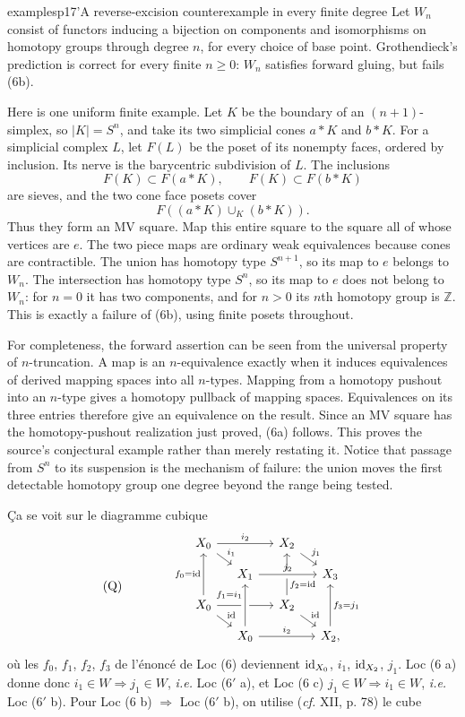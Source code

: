 \begin{dcomment}{examples}{p17'}{A reverse-excision counterexample in every finite degree}
Let $W_n$ consist of functors inducing a bijection on components and isomorphisms on homotopy groups through degree $n$, for every choice of base point. Grothendieck's prediction is correct for every finite $n\geq0$: $W_n$ satisfies forward gluing, but fails (6b).

Here is one uniform finite example. Let $K$ be the boundary of an $(n+1)$-simplex, so $|K|=S^n$, and take its two simplicial cones $a*K$ and $b*K$. For a simplicial complex $L$, let $F(L)$ be the poset of its nonempty faces, ordered by inclusion. Its nerve is the barycentric subdivision of $L$. The inclusions
\[
F(K)\subset F(a*K),\qquad F(K)\subset F(b*K)
\]
are sieves, and the two cone face posets cover
\[
F((a*K)\cup_K(b*K)).
\]
Thus they form an MV square. Map this entire square to the square all of whose vertices are $e$. The two piece maps are ordinary weak equivalences because cones are contractible. The union has homotopy type $S^{n+1}$, so its map to $e$ belongs to $W_n$. The intersection has homotopy type $S^n$, so its map to $e$ does not belong to $W_n$: for $n=0$ it has two components, and for $n>0$ its $n$th homotopy group is $\mathbb Z$. This is exactly a failure of (6b), using finite posets throughout.

For completeness, the forward assertion can be seen from the universal property of $n$-truncation. A map is an $n$-equivalence exactly when it induces equivalences of derived mapping spaces into all $n$-types. Mapping from a homotopy pushout into an $n$-type gives a homotopy pullback of mapping spaces. Equivalences on its three entries therefore give an equivalence on the result. Since an MV square has the homotopy-pushout realization just proved, (6a) follows. This proves the source's conjectural example rather than merely restating it. Notice that passage from $S^n$ to its suspension is the mechanism of failure: the union moves the first detectable homotopy group one degree beyond the range being tested.
\end{dcomment}


Ça se voit sur le diagramme cubique
\[
\text{(Q)}\qquad\qquad
\begin{tikzcd}[row sep=small,column sep=small]
X_0 \arrow[rr,"i_2"] \arrow[dr,"i_1"] & & X_2 \arrow[dr,"j_1"] \arrow[from=dd,"f_2=\id"' near start] & \\
& X_1 \arrow[rr,"j_2",crossing over] & & X_3 \\
X_0 \arrow[uu,"f_0=\id"] \arrow[rr,"i_2"] \arrow[dr,"\id"] & & X_2 \arrow[dr,"\id"] & \\
& X_0 \arrow[rr,"i_2"] \arrow[uu,crossing over,"f_1=i_1" near end] & & X_2, \arrow[uu,"f_3=j_1"']
\end{tikzcd}
\]
où les $f_0$, $f_1$, $f_2$, $f_3$ de l'énoncé de Loc (6) deviennent $\mathrm{id}_{X_0}$, $i_1$, $\mathrm{id}_{X_2}$, $j_1$. Loc (6 a) donne donc $i_1\in W\Longrightarrow j_1\in W$, \textit{i.e.} Loc (6$'$ a), et Loc (6 c) $j_1\in W\Longrightarrow i_1\in W$, \textit{i.e.} Loc (6$'$ b). Pour Loc (6 b) $\Longrightarrow$ Loc (6$'$ b), on utilise (\textit{cf.} XII, p. 78) le cube

